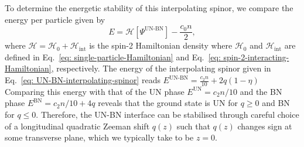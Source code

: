 To determine the energetic stability of this interpolating spinor, we compare
the energy per particle given by~\cite{Kawaguchi2012}
\begin{equation}\label{eq: energy-per-particle}
    E = \mathcal{H}[\Psi^\text{UN-BN}] - \frac{c_0n}{2},
\end{equation}
where \(\mathcal{H} = \mathcal{H}_0 + \mathcal{H}_\text{int}\) is the spin-2
Hamiltonian density where \(\mathcal{H}_0\) and \(\mathcal{H}_\text{int}\)
are defined in Eq.~\eqref{eq: single-particle-Hamiltonian} and
Eq.~\eqref{eq: spin-2-interacting-Hamiltonian}, respectively.
The energy of the interpolating spinor given in
Eq.~\eqref{eq: UN-BN-interpolating-spinor} reads
\(E^\text{UN-BN} = \frac{c_2n}{10} + 2q(1 - \eta)\)
Comparing this energy with that of the UN phase
\(E^\text{UN} = c_2n/10\) and the BN phase
\(E^\text{BN} = c_2n/10 + 4q\) reveals that the ground state is UN for
\(q \geq 0\) and BN for \(q \leq 0\).
Therefore, the UN-BN interface can be stabilised through careful choice of
a longitudinal quadratic Zeeman shift \(q(z)\) such that \(q(z)\) changes
sign at some transverse plane, which we typically take to be \(z=0\).

